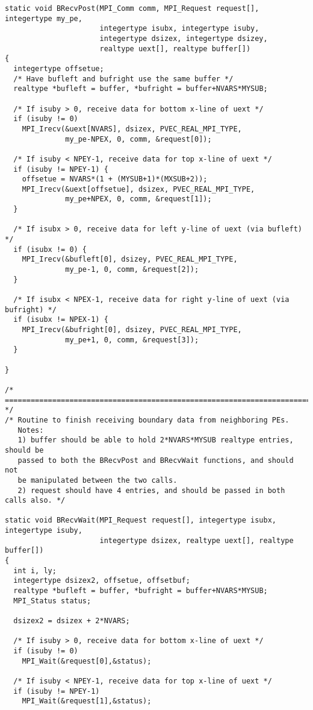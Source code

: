 \begin{verbatim}
static void BRecvPost(MPI_Comm comm, MPI_Request request[], integertype my_pe,
                      integertype isubx, integertype isuby,
                      integertype dsizex, integertype dsizey,
                      realtype uext[], realtype buffer[])
{
  integertype offsetue;
  /* Have bufleft and bufright use the same buffer */
  realtype *bufleft = buffer, *bufright = buffer+NVARS*MYSUB;

  /* If isuby > 0, receive data for bottom x-line of uext */
  if (isuby != 0)
    MPI_Irecv(&uext[NVARS], dsizex, PVEC_REAL_MPI_TYPE,
              my_pe-NPEX, 0, comm, &request[0]);

  /* If isuby < NPEY-1, receive data for top x-line of uext */
  if (isuby != NPEY-1) {
    offsetue = NVARS*(1 + (MYSUB+1)*(MXSUB+2));
    MPI_Irecv(&uext[offsetue], dsizex, PVEC_REAL_MPI_TYPE,
              my_pe+NPEX, 0, comm, &request[1]);
  }
  
  /* If isubx > 0, receive data for left y-line of uext (via bufleft) */
  if (isubx != 0) {
    MPI_Irecv(&bufleft[0], dsizey, PVEC_REAL_MPI_TYPE,
              my_pe-1, 0, comm, &request[2]);
  }
  
  /* If isubx < NPEX-1, receive data for right y-line of uext (via bufright) */
  if (isubx != NPEX-1) {
    MPI_Irecv(&bufright[0], dsizey, PVEC_REAL_MPI_TYPE,
              my_pe+1, 0, comm, &request[3]);
  }
  
}

/* ======================================================================= */
/* Routine to finish receiving boundary data from neighboring PEs.
   Notes:
   1) buffer should be able to hold 2*NVARS*MYSUB realtype entries, should be
   passed to both the BRecvPost and BRecvWait functions, and should not
   be manipulated between the two calls.
   2) request should have 4 entries, and should be passed in both calls also. */

static void BRecvWait(MPI_Request request[], integertype isubx, integertype isuby,
                      integertype dsizex, realtype uext[], realtype buffer[])
{
  int i, ly;
  integertype dsizex2, offsetue, offsetbuf;
  realtype *bufleft = buffer, *bufright = buffer+NVARS*MYSUB;
  MPI_Status status;
  
  dsizex2 = dsizex + 2*NVARS;
  
  /* If isuby > 0, receive data for bottom x-line of uext */
  if (isuby != 0)
    MPI_Wait(&request[0],&status);
  
  /* If isuby < NPEY-1, receive data for top x-line of uext */
  if (isuby != NPEY-1)
    MPI_Wait(&request[1],&status);


\end{verbatim}
